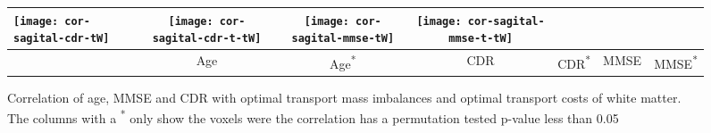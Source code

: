 \documentclass{llncs}
\begin{document}
\begin{figure}[!b]
\begin{tabular}{l|cc|cc|cc}
\texttt{[image: cor-sagital-cdr-tW]} &
\texttt{[image: cor-sagital-cdr-t-tW]} &
\texttt{[image: cor-sagital-mmse-tW]} &
\texttt{[image: cor-sagital-mmse-t-tW]} \\ \hline \hline
%
& \parbox[b][4mm]{6mm}{Age} 
& \parbox[b][4mm]{6mm}{Age\textsuperscript{*}} 
& \parbox[b][4mm]{6mm}{CDR} 
& \parbox[b][4mm]{6mm}{CDR\textsuperscript{*}}
& \parbox[b][4mm]{6mm}{MMSE}
& \parbox[b][4mm]{6mm}{MMSE\textsuperscript{*}}
\end{tabular}
\caption{\label{fig:cor-oasis-white}
Correlation of age, MMSE and CDR with optimal transport mass imbalances and
optimal transport costs of white matter. The columns with a \textsuperscript{*}
only show the voxels were the correlation has a permutation tested p-value less
than 0.05  }
\end{figure}
\endgroup
\end{document}
